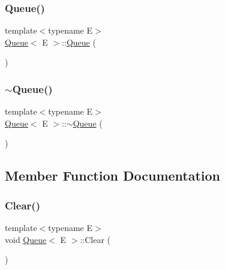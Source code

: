 \subsubsection{\texorpdfstring{Queue()}{Queue()}}
{\footnotesize\ttfamily template$<$typename E$>$ \\
\hyperlink{class_queue}{Queue}$<$ E $>$\+::\hyperlink{class_queue}{Queue} (\begin{DoxyParamCaption}{ }\end{DoxyParamCaption})\hspace{0.3cm}{\ttfamily [inline]}}

\mbox{\label{class_queue_a49fe82adb8dc2fb62ab53876a6933d0f}} 
\subsubsection{\texorpdfstring{$\sim$\+Queue()}{~Queue()}}
{\footnotesize\ttfamily template$<$typename E$>$ \\
\hyperlink{class_queue}{Queue}$<$ E $>$\+::$\sim$\hyperlink{class_queue}{Queue} (\begin{DoxyParamCaption}{ }\end{DoxyParamCaption})\hspace{0.3cm}{\ttfamily [inline]}}



\subsection{Member Function Documentation}
\mbox{\label{class_queue_acfdd5f9f7e936ca30dcf877370ef9510}} 
\subsubsection{\texorpdfstring{Clear()}{Clear()}}
{\footnotesize\ttfamily template$<$typename E$>$ \\
void \hyperlink{class_queue}{Queue}$<$ E $>$\+::Clear (\begin{DoxyParamCaption}{ }\end{DoxyParamCaption})\hspace{0.3cm}{\ttfamily [inline]}}

\mbox{\label{class_queue_a434d465001c3078e999f7a89a8af84c0}} 
